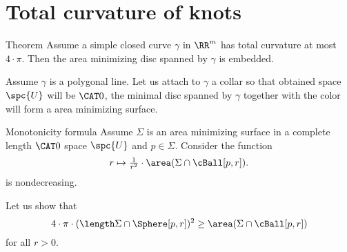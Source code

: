 \section{Total curvature of knots}

\begin{thm}{Theorem}
Assume a simple closed curve $\gamma$ in $\RR^m$ has total curvature at most $4\cdot\pi$.
Then the area minimizing disc spanned by $\gamma$ is embedded.
\end{thm}

Assume $\gamma$ is a polygonal line.
Let us attach to $\gamma$ a collar so that obtained space $\spc{U}$ will be $\CAT0$,
the minimal disc spanned by $\gamma$ together with the color will form a area minimizing surface.


\begin{thm}{Monotonicity formula}
Assume $\Sigma$ is an area minimizing surface in a complete length $\CAT0$ space $\spc{U}$
and $p\in\Sigma$.
Consider the function
\[r\mapsto\tfrac1{r^2}\cdot\area(\Sigma\cap\cBall[p,r]).\]
is nondecreasing.
\end{thm}

Let us show that 
\[4\cdot\pi\cdot(\length\Sigma\cap\Sphere[p,r])^2\ge \area(\Sigma\cap\cBall[p,r])\]
for all $r>0$.


\qeds


 

